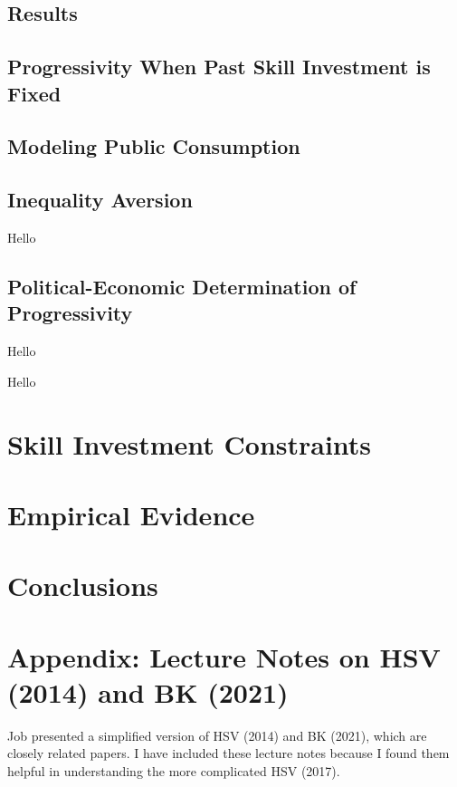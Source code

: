 \documentclass{article}
\begin{document}
\subsection{Results}

\subsection{Progressivity When Past Skill Investment is Fixed}

\subsection{Modeling Public Consumption}

\subsection{Inequality Aversion}

{
\proposition Hello

}

\subsection{Political-Economic Determination of Progressivity}

{
\proposition Hello

}

{
\proposition Hello

}

\section{Skill Investment Constraints}

\section{Empirical Evidence}

\section{Conclusions}

\pagebreak

\section*{Appendix: Lecture Notes on HSV (2014) and BK (2021)}

Job presented a simplified version of HSV (2014) and BK (2021), which are closely related papers. I have included these lecture notes because I found them helpful in understanding the more complicated HSV (2017). 
\end{document}
